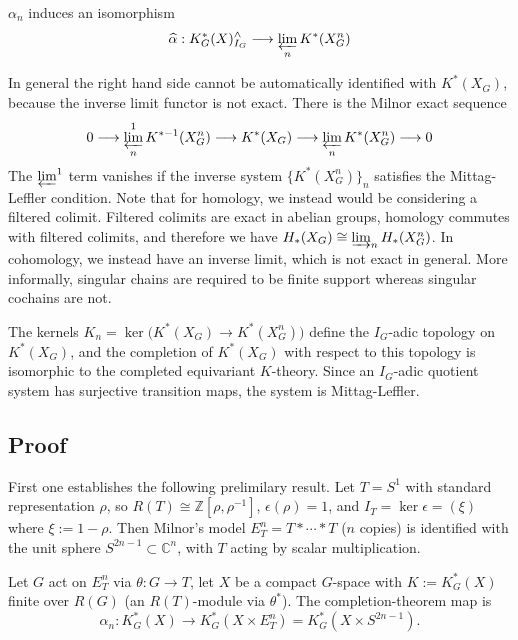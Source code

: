 \documentclass[12pt]{article}
\begin{document}
\begin{corollary}
    $\alpha_n$ induces an isomorphism \begin{align*}
        \widehat{\alpha}:K_G^*(X)^{\wedge}_{I_G}\longrightarrow \varprojlim_n K^*(X_G^n)
    \end{align*}
\end{corollary}
In general the right hand side cannot be automatically identified with $K^*(X_G)$, because the inverse limit functor is not exact. There is the Milnor exact sequence
\[
0\longrightarrow \varprojlim_n^1 K^{*-1}(X_G^n)\longrightarrow K^*(X_G)\longrightarrow \varprojlim_n K^*(X_G^n)\longrightarrow 0
\] The $\varprojlim^1$ term vanishes if the inverse system $\{K^*(X_G^n)\}_n$ satisfies the Mittag-Leffler condition. Note that for homology, we instead would be considering a filtered colimit. Filtered colimits are exact in abelian groups, homology commutes with filtered colimits, and therefore we have $H_*(X_G)\cong \varinjlim_n H_*(X_G^n)$. In cohomology, we instead have an inverse limit, which is not exact in general. More informally, singular chains are required to be finite support whereas singular cochains are not.

\begin{corollary}
    The kernels $K_n = \ker\big(K^*(X_G)\to K^*(X_G^n)\big)$ define the $I_G$-adic topology on $K^*(X_G)$, and the completion of $K^*(X_G)$ with respect to this topology is isomorphic to the completed equivariant $K$-theory. Since an $I_G$-adic quotient system has surjective transition maps, the system is Mittag-Leffler.
\end{corollary}

\subsection{Proof}
First one establishes the following prelimilary result.
Let $T=S^1$ with standard representation $\rho$, so $R(T)\cong\mathbb Z[\rho,\rho^{-1}]$,
$\epsilon(\rho)=1$, and $I_T=\ker\epsilon=(\xi)$ where $\xi:=1-\rho$. Then Milnor's model $E_T^n = T*\cdots*T$ ($n$ copies) is identified with the unit sphere
$S^{2n-1}\subset\mathbb C^n$, with $T$ acting by scalar multiplication.

Let $G$ act on $E_T^n$ via $\theta:G\to T$, let $X$ be a compact $G$-space with
$K:=K_G^*(X)$ finite over $R(G)$ (an $R(T)$-module via $\theta^*$). The completion-theorem map is
\[
\alpha_n: K_G^*(X)\longrightarrow K_G^*(X\times E_T^n)=K_G^*(X\times S^{2n-1}).
\]
\end{document}
